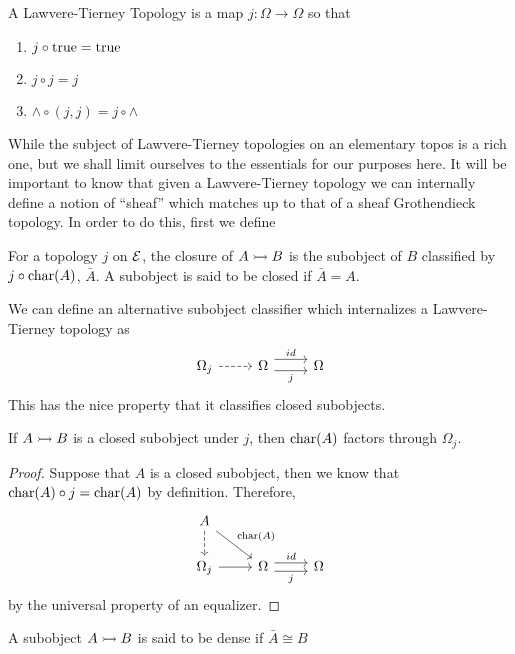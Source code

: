 \begin{defn}\label{defn:background:lawveretierney}
  A Lawvere-Tierney Topology is a map $j : \Omega \to \Omega$ so that
  \begin{enumerate}
  \item $j \circ \operatorname{true} = \operatorname{true}$
  \item $j \circ j = j$
  \item $\wedge \circ (j, j) = j \circ \wedge$
  \end{enumerate}
\end{defn}
While the subject of Lawvere-Tierney topologies on an elementary topos
is a rich one, but we shall limit ourselves to the essentials for our
purposes here. It will be important to know that given a
Lawvere-Tierney topology we can internally define a notion of
``sheaf'' which matches up to that of a sheaf Grothendieck
topology. In order to do this, first we define
\begin{defn}\label{defn:background:closure}
  For a topology $j$ on $\mathcal{E}$, the closure of $A \rightarrowtail B$ is the
  subobject of $B$ classified by $j \circ \operatorname{char}(A)$, $\bar{A}$. A
  subobject is said to be closed if $\bar{A} = A$.
\end{defn}

We can define an alternative subobject classifier which internalizes
a Lawvere-Tierney topology as
\[
  \begin{tikzcd}
    \Omega_j \ar[r, dashed] &
    \Omega \ar[r, shift left=0.5em, "id"]
    \ar[r, shift right=0.3em, swap, "j"] &
    \Omega
  \end{tikzcd}
\]
This has the nice property that it classifies closed subobjects.
\begin{lem}\label{lem:background:closedfactors}
  If $A \rightarrowtail B$ is a closed subobject under $j$, then $\operatorname{char}(A)$
  factors through $\Omega_j$.
\end{lem}
\begin{proof}
  Suppose that $A$ is a closed subobject, then we know that
  $\operatorname{char}(A) \circ j = \operatorname{char}(A)$ by definition. Therefore,
  \[
    \begin{tikzcd}
      A \ar[d, dashed] \ar[dr, "\charmap(A)"] & &\\
      \Omega_j \ar[r]&
      \Omega \ar[r, shift left=0.3em, "id"] \ar[r, shift right = 0.3em, swap, "j"] & \Omega
    \end{tikzcd}
  \]
  by the universal property of an equalizer.
\end{proof}

\begin{defn}\label{defn:background:dense}
  A subobject $A \rightarrowtail B$ is said to be dense if $\bar{A} \cong B$
\end{defn}

